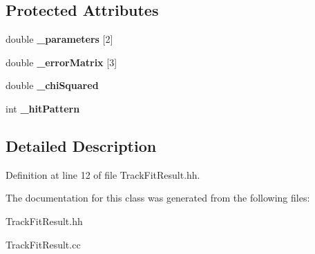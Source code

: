 \subsection*{Protected Attributes}
\begin{DoxyCompactItemize}
\item 
double {\bfseries \_\-parameters} [2]\label{classTBTrack_1_1TrackFitResult_ae9b05a73283ac5d325e9bf1a07658854}

\item 
double {\bfseries \_\-errorMatrix} [3]\label{classTBTrack_1_1TrackFitResult_ac56f2127f056edc21a142686304b2acc}

\item 
double {\bfseries \_\-chiSquared}\label{classTBTrack_1_1TrackFitResult_acdb3c7423e9cb577feb311f30a8f31e7}

\item 
int {\bfseries \_\-hitPattern}\label{classTBTrack_1_1TrackFitResult_a585ab993aa74efcb9a0852df862d2be4}

\end{DoxyCompactItemize}


\subsection{Detailed Description}


Definition at line 12 of file TrackFitResult.hh.

The documentation for this class was generated from the following files:\begin{DoxyCompactItemize}
\item 
TrackFitResult.hh\item 
TrackFitResult.cc\end{DoxyCompactItemize}
